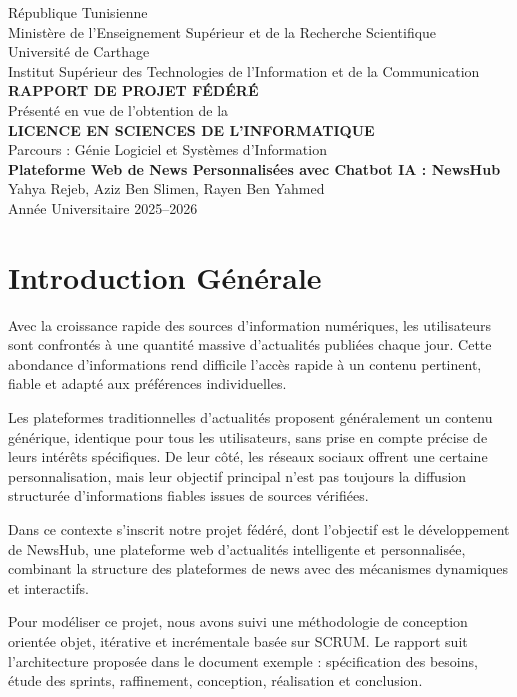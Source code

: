 \documentclass[12pt,a4paper]{report}
\begin{document}
\begin{titlepage}
\centering
République Tunisienne\\
Ministère de l'Enseignement Supérieur et de la Recherche Scientifique\\
Université de Carthage\\
Institut Supérieur des Technologies de l'Information et de la Communication\\[2cm]
{\Large \textbf{RAPPORT DE PROJET FÉDÉRÉ}}\\[1cm]
Présenté en vue de l'obtention de la\\
\textbf{LICENCE EN SCIENCES DE L'INFORMATIQUE}\\
Parcours : Génie Logiciel et Systèmes d'Information\\[1.5cm]
{\Large \textbf{Plateforme Web de News Personnalisées avec Chatbot IA : NewsHub}}\\[1.5cm]
Yahya Rejeb, Aziz Ben Slimen, Rayen Ben Yahmed\\[1.5cm]
Année Universitaire 2025--2026
\end{titlepage}

\tableofcontents
\clearpage

\chapter*{Introduction Générale}
Avec la croissance rapide des sources d'information numériques, les utilisateurs sont confrontés à une quantité massive d'actualités publiées chaque jour. Cette abondance d'informations rend difficile l'accès rapide à un contenu pertinent, fiable et adapté aux préférences individuelles.

Les plateformes traditionnelles d'actualités proposent généralement un contenu générique, identique pour tous les utilisateurs, sans prise en compte précise de leurs intérêts spécifiques. De leur côté, les réseaux sociaux offrent une certaine personnalisation, mais leur objectif principal n'est pas toujours la diffusion structurée d'informations fiables issues de sources vérifiées.

Dans ce contexte s'inscrit notre projet fédéré, dont l'objectif est le développement de NewsHub, une plateforme web d'actualités intelligente et personnalisée, combinant la structure des plateformes de news avec des mécanismes dynamiques et interactifs.

Pour modéliser ce projet, nous avons suivi une méthodologie de conception orientée objet, itérative et incrémentale basée sur SCRUM. Le rapport suit l'architecture proposée dans le document exemple : spécification des besoins, étude des sprints, raffinement, conception, réalisation et conclusion.
\end{document}
